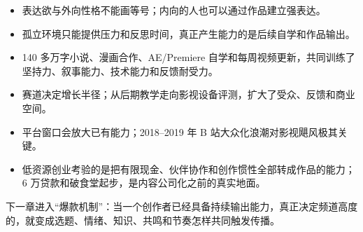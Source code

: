 \begin{itemize}
  \item 表达欲与外向性格不能画等号；内向的人也可以通过作品建立强表达。
  \item 孤立环境只能提供压力和反思时间，真正产生能力的是后续自学和作品输出。
  \item 140 多万字小说、漫画合作、AE/Premiere 自学和每周视频更新，共同训练了坚持力、叙事能力、技术能力和反馈耐受力。
  \item 赛道决定增长半径；从后期教学走向影视设备评测，扩大了受众、反馈和商业空间。
  \item 平台窗口会放大已有能力；2018--2019 年 B 站大众化浪潮对影视飓风极其关键。
  \item 低资源创业考验的是把有限现金、伙伴协作和创作惯性全部转成作品的能力；6 万贷款和破食堂起步，是内容公司化之前的真实地面。
\end{itemize}

下一章进入“爆款机制”：当一个创作者已经具备持续输出能力，真正决定频道高度的，就变成选题、情绪、知识、共鸣和节奏怎样共同触发传播。
